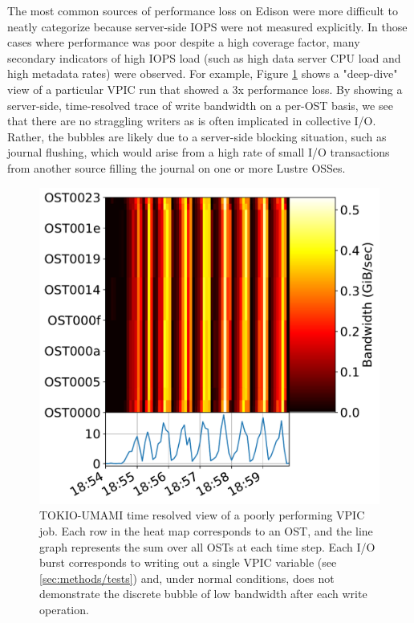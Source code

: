 {The most common sources of performance loss on Edison were more difficult to neatly categorize because server-side IOPS were not measured explicitly.  In those cases where performance was poor despite a high coverage factor, many secondary indicators of high IOPS load (such as high data server CPU load and high metadata rates) were observed.  For example, Figure \ref{fig:umami-deepdive} shows a "deep-dive" view of a particular VPIC run that showed a 3x performance loss.  By showing a server-side, time-resolved trace of write bandwidth on a per-OST basis, we see that there are no straggling writers as is often implicated in collective I/O.  Rather, the bubbles are likely due to a server-side blocking situation, such as journal flushing, which would arise from a high rate of small I/O transactions from another source filling the journal on one or more Lustre OSSes.

\begin{figure}[t]
    \centering
    \includegraphics[width=1.0\columnwidth]{figs/deepdive-scratch3-vpic-write_feb24.pdf}
    \caption{TOKIO-UMAMI time resolved view of a poorly performing VPIC job.  Each row in the heat map corresponds to an OST, and the line graph represents the sum over all OSTs at each time step.  Each I/O burst corresponds to writing out a single VPIC variable (see \ref{sec:methods/tests}) and, under normal conditions, does not demonstrate the discrete bubble of low bandwidth after each write operation.}
    \label{fig:umami-deepdive}
\end{figure}

}
